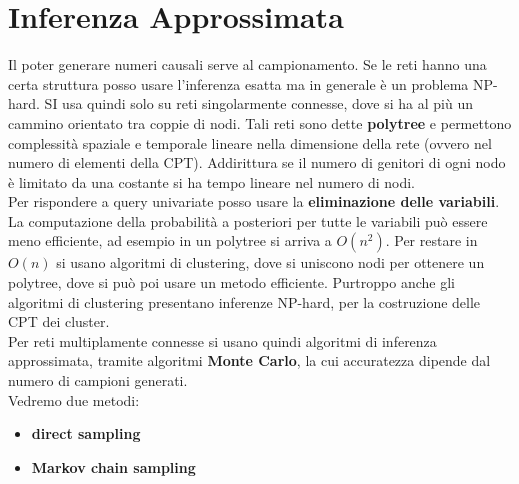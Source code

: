 \documentclass[a4paper,12pt, oneside]{book}
\begin{document}
\section{Inferenza Approssimata}
Il poter generare numeri causali serve al campionamento. Se le reti hanno una
certa struttura posso usare l'inferenza esatta ma in generale è un problema
NP-hard. SI usa quindi solo su reti singolarmente connesse, dove si ha al più un
cammino orientato tra coppie di nodi. Tali reti sono dette \textbf{polytree} e
permettono complessità spaziale e temporale lineare nella dimensione della rete
(ovvero nel numero di elementi della CPT). Addirittura se il numero di genitori
di ogni nodo è limitato da una costante si ha tempo lineare nel numero di
nodi.\\
Per rispondere a query univariate posso usare la \textbf{eliminazione delle
  variabili}.\\
La computazione della probabilità a posteriori per tutte le variabili può essere
meno efficiente, ad esempio in un polytree si arriva a $O(n^2)$. Per restare in
$O(n)$ si usano algoritmi di clustering, dove si uniscono nodi per ottenere un
polytree, dove si può poi usare un metodo efficiente. Purtroppo anche gli
algoritmi di clustering presentano inferenze NP-hard, per la costruzione delle
CPT dei cluster.\\
Per reti multiplamente connesse si usano quindi algoritmi di inferenza
approssimata, tramite algoritmi \textbf{Monte Carlo}, la cui accuratezza dipende
dal numero di campioni generati.\\
Vedremo due metodi:
\begin{itemize}
  \item \textbf{direct sampling}
  \item \textbf{Markov chain sampling}
\end{itemize}
\end{document}
